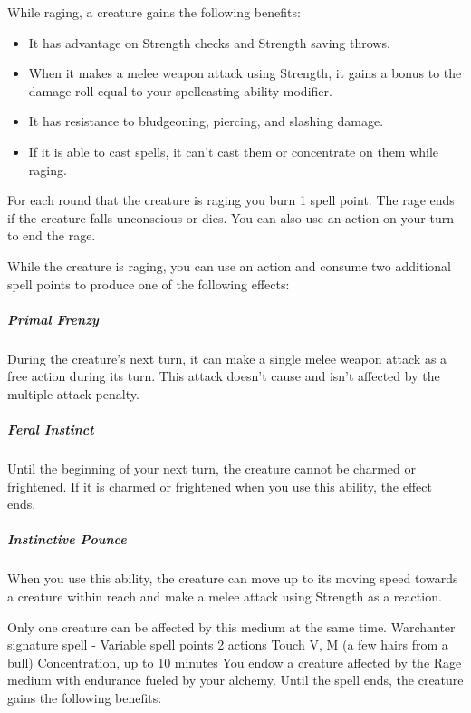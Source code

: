         While raging, a creature gains the following benefits:
        \begin{itemize}
            \item It has advantage on Strength checks and Strength saving throws.
            \item When it makes a melee weapon attack using Strength, it gains a bonus to the damage roll equal to your spellcasting ability modifier.
            \item It has resistance to bludgeoning, piercing, and slashing damage.
            \item If it is able to cast spells, it can't cast them or concentrate on them while raging.
        \end{itemize}

        For each round that the creature is raging you burn 1 spell point.
        The rage ends if the creature falls unconscious or dies.
        You can also use an action on your turn to end the rage.

        While the creature is raging, you can use an action and consume two additional spell points to produce one of the following effects:

        \subparagraph{Primal Frenzy}
        During the creature's next turn, it can make a single melee weapon attack as a free action during its turn.
        This attack doesn't cause and isn't affected by the multiple attack penalty.
        \subparagraph{Feral Instinct}
        Until the beginning of your next turn, the creature cannot be charmed or frightened.
        If it is charmed or frightened when you use this ability, the effect ends.
        \subparagraph{Instinctive Pounce}
        When you use this ability, the creature can move up to its moving speed towards a creature within reach and make a melee attack using Strength as a reaction.

        Only one creature can be affected by this medium at the same time.
        {Warchanter signature spell - Variable spell points}
        {2 actions}
        {Touch}
        {V, M (a few hairs from a bull)}
        {Concentration, up to 10 minutes}
        You endow a creature affected by the Rage medium with endurance fueled by your alchemy.
        Until the spell ends, the creature gains the following benefits:

